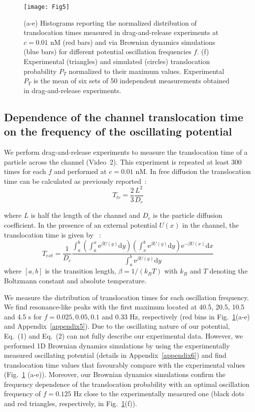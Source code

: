 \documentclass[
 reprint,
 aps, showkeys, showpacs
]{revtex4-1}
\begin{document}
\begin{figure}
	\texttt{[image: Fig5]}
	\caption{\label{Fig5} (a-e) Histograms reporting the normalized distribution of translocation times measured in drag-and-release experiments at $c=0.01$ nM (red bars) and via Brownian dynamics simulations (blue bars) for different potential oscillation frequencies $f$. (f) Experimental (triangles) and simulated (circles) translocation probability $P_T$ normalized to their maximum values. Experimental $P_T$ is the mean of six sets of 50 independent measurements obtained in drag-and-release experiments.}
\end{figure}

\subsection{Dependence of the channel translocation time on the frequency of the oscillating potential}
We perform drag-and-release experiments to measure the translocation time of a particle across the channel (Video~2). This experiment is repeated at least 300 times for each $f$ and performed at  $c= 0.01$ nM. In free diffusion the translocation time can be calculated as previously reported~\cite{redner2001guide}:
\begin{equation}\label{eq1}
T_{tr}=\frac{2}{3}\frac{L^2}{D_c}
\end{equation}

where $L$ is half the length of the channel and $D_c$ is the particle diffusion coefficient. In the presence of an external potential $U(x)$ in the channel, the translocation time is given by ~\cite{Berezhkovskii2017}:
\begin{equation}\label{eq2}
T_{ext}=\frac{1}{D_c}\frac{\int_{a}^{b}(\int_{a}^{x}\mathrm{e}^{\beta U(y)}\mathrm{d}y)(\int_{x}^{b}\mathrm{e}^{\beta U(y)}\mathrm{d}y)\mathrm{e}^{-\beta U(x)}\mathrm{d}x }{\int_{a}^{b}\mathrm{e}^{\beta U(y)}\mathrm{d}y}
\end{equation}
where $[a,b]$ is the transition length, $\beta=1/(k_BT)$ with $k_B$ and $T$ denoting the Boltzmann constant and absolute temperature.

We measure the distribution of translocation times for each oscillation frequency. We find resonance-like peaks with the first maximum located at 40.5, 20.5, 10.5 and 4.5 s for $f=0.025, 0.05, 0.1$ and 0.33 Hz, respectively (red bins in Fig.~\ref{Fig5}(a-e) and Appendix~\ref{appendix5}). Due to the oscillating nature of our potential, Eq.~(1) and Eq.~(2) can not fully describe our experimental data. However, we performed 1D Brownian dynamics simulations by using the experimentally measured oscillating potential (details in Appendix~\ref{appendix6}) and find translocation time values that favourably compare with the experimental values (Fig.~\ref{Fig5} (a-e)). Moreover, our Brownian dynamics simulations confirm the frequency dependence of the translocation probability with an optimal oscillation frequency of $f = 0.125$ Hz close to the experimentally measured one (black dots and red triangles, respectively, in Fig.~\ref{Fig5}(f)). 
\end{document}
